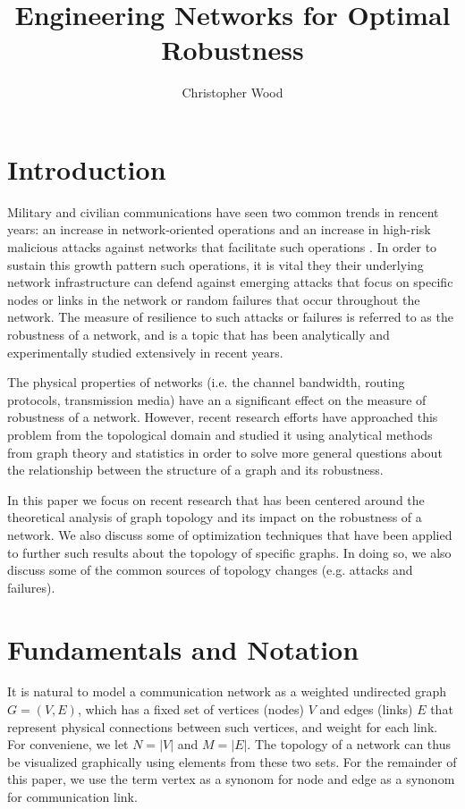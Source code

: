 \documentclass[doc]{apa}%
\title{Engineering Networks for Optimal Robustness}
\author{Christopher Wood}
\affiliation{Department of Computer Science \\ Rochester Institute of Technology}
\begin{document}
\maketitle   


\section{Introduction}

Military and civilian communications have seen two common trends in rencent years: an increase in network-oriented operations and an increase in high-risk malicious attacks against networks that facilitate such operations \cite{Bernardnetworkrobustness}. In order to sustain this growth pattern such operations, it is vital they their underlying network infrastructure can defend against emerging attacks that focus on specific nodes or links in the network or random failures that occur throughout the network. The measure of resilience to such attacks or failures is referred to as the robustness of a network, and is a topic that has been analytically and experimentally studied extensively in recent years.

The physical properties of networks (i.e. the channel bandwidth, routing protocols, transmission media) have an a significant effect on the measure of robustness of a network. However, recent research efforts have approached this problem from the topological domain and studied it using analytical methods from graph theory and statistics in order to solve more general questions about the relationship between the structure of a graph and its robustness. 

In this paper we focus on recent research that has been centered around the theoretical analysis of graph topology and its impact on the robustness of a network. We also discuss some of optimization techniques that have been applied to further such results about the topology of specific graphs. In doing so, we also discuss some of the common sources of topology changes (e.g. attacks and failures). 

\section{Fundamentals and Notation}

It is natural to model a communication network as a weighted undirected graph $G = (V,E)$, which has a fixed set of vertices (nodes) $V$ and edges (links) $E$ that represent physical connections between such vertices, and weight for each link. For conveniene, we let $N = |V|$ and $M = |E|$. The topology of a network can thus be visualized graphically using elements from these two sets. For the remainder of this paper, we use the term vertex as a synonom for node and edge as a synonom for communication link. 
\end{document}

